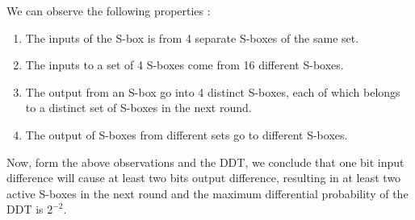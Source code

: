 \documentclass[preprint]{transcrypto}
\begin{document}
\begin{figure}[h!]
\label{fig2}
\end{figure}
    We can observe the following properties : 
    \begin{enumerate}
        \item The inputs of the S-box is from 4 separate S-boxes of the same set. 
        \item The inputs to a set of 4 S-boxes come from 16 different S-boxes.
        \item The output from an S-box go into 4 distinct S-boxes, each of which belongs to a distinct set of S-boxes in the next round.
        \item The output of S-boxes from different sets go to different S-boxes. 
    \end{enumerate}
Now, form the above observations and the DDT, we conclude that one bit input difference will cause at least two bits output difference, resulting in at least two active S-boxes in the next round and the maximum differential probability of the DDT is $2^{-2}$. 
\end{document}
